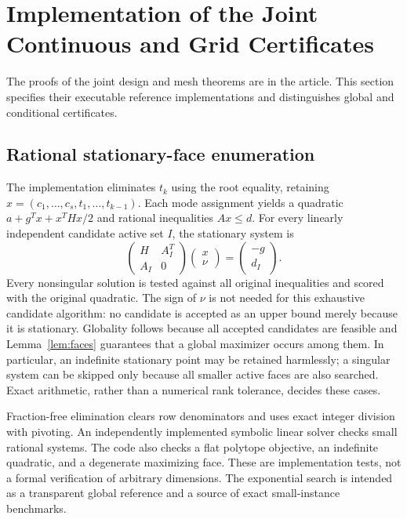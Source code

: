 \section{Implementation of the Joint Continuous and Grid Certificates}\label{ec:r42-implementation}
The proofs of the joint design and mesh theorems are in the article. This section specifies their executable reference implementations and distinguishes global and conditional certificates.

\subsection{Rational stationary-face enumeration}
The implementation eliminates $t_k$ using the root equality, retaining $x=(c_1,\ldots,c_s,t_1,\ldots,t_{k-1})$. Each mode assignment yields a quadratic $a+g^Tx+x^THx/2$ and rational inequalities $Ax\leq d$. For every linearly independent candidate active set $I$, the stationary system is
\[
 \begin{pmatrix}H&A_I^T\\A_I&0\end{pmatrix}
 \begin{pmatrix}x\\\nu\end{pmatrix}
 =\begin{pmatrix}-g\\d_I\end{pmatrix}.
\]
Every nonsingular solution is tested against all original inequalities and scored with the original quadratic. The sign of $\nu$ is not needed for this exhaustive candidate algorithm: no candidate is accepted as an upper bound merely because it is stationary. Globality follows because all accepted candidates are feasible and Lemma~\ref{lem:faces} guarantees that a global maximizer occurs among them. In particular, an indefinite stationary point may be retained harmlessly; a singular system can be skipped only because all smaller active faces are also searched. Exact arithmetic, rather than a numerical rank tolerance, decides these cases.

Fraction-free elimination clears row denominators and uses exact integer division with pivoting. An independently implemented symbolic linear solver checks small rational systems. The code also checks a flat polytope objective, an indefinite quadratic, and a degenerate maximizing face. These are implementation tests, not a formal verification of arbitrary dimensions. The exponential search is intended as a transparent global reference and a source of exact small-instance benchmarks.

